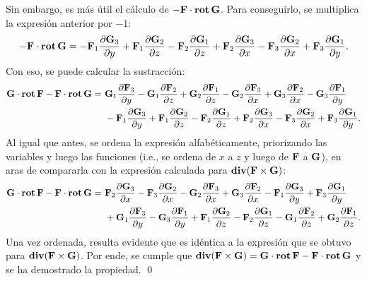 \documentclass{fmbvecto}
\begin{document}
\begin{problema}
\begin{equation*}
\end{equation*}
Sin embargo, es más útil el cálculo de \(- \bvec{F}\cdot \rot\bvec{G}\). Para conseguirlo, se multiplica la expresión anterior por \(-1\):
\begin{equation*}
    -\bvec{F}\cdot \rot\bvec{G} = - \bvec{F}_1 \frac{\partial \bvec{G}_3}{\partial y} + \bvec{F}_1\frac{\partial \bvec{G}_2}{\partial z} -\bvec{F}_2\frac{\partial \bvec{G}_1}{\partial z} + \bvec{F}_2\frac{\partial \bvec{G}_3}{\partial x} - \bvec{F}_3\frac{\partial \bvec{G}_2}{\partial x} + \bvec{F}_3\frac{\partial \bvec{G}_1}{\partial y}.
\end{equation*}
Con eso, se puede calcular la sustracción:
\begin{align*}
    \bvec{G}\cdot \rot\bvec{F} - \bvec{F}\cdot \rot \bvec{G} = \ & \bvec{G}_1 \frac{\partial \bvec{F}_3}{\partial y} - \bvec{G}_1\frac{\partial \bvec{F}_2}{\partial z} + \bvec{G}_2\frac{\partial \bvec{F}_1}{\partial z} - \bvec{G}_2\frac{\partial \bvec{F}_3}{\partial x} + \bvec{G}_3\frac{\partial \bvec{F}_2}{\partial x} - \bvec{G}_3\frac{\partial \bvec{F}_1}{\partial y} \\ &- \bvec{F}_1 \frac{\partial \bvec{G}_3}{\partial y} + \bvec{F}_1\frac{\partial \bvec{G}_2}{\partial z} -\bvec{F}_2\frac{\partial \bvec{G}_1}{\partial z} + \bvec{F}_2\frac{\partial \bvec{G}_3}{\partial x} - \bvec{F}_3\frac{\partial \bvec{G}_2}{\partial x} + \bvec{F}_3\frac{\partial \bvec{G}_1}{\partial y}.
\end{align*}
Al igual que antes, se ordena la expresión alfabéticamente, priorizando las variables y luego las funciones (i.e., se ordena de \(x\) a \(z\) y luego de \(\bvec{F}\) a \(\bvec{G}\)), en aras de compararla con la expresión calculada para \(\div (\bvec{F} \times \bvec{G})\):
\begin{align*}
    \bvec{G}\cdot \rot\bvec{F} - \bvec{F}\cdot \rot \bvec{G} = \ & \bvec{F}_2\frac{\partial  \bvec{G}_3}{\partial x} - \bvec{F}_3\frac{\partial \bvec{G}_2}{\partial x} - \bvec{G}_2\frac{\partial \bvec{F}_3 }{\partial x} + \bvec{G}_3\frac{\partial \bvec{F}_2}{\partial x} - \bvec{F}_1\frac{\partial \bvec{G}_3}{\partial y} + \bvec{F}_3\frac{\partial \bvec{G}_1}{\partial y} \\ & + \bvec{G}_1\frac{\partial \bvec{F}_3}{\partial y} - \bvec{G}_3\frac{\partial \bvec{F}_1}{\partial y} + \bvec{F}_1\frac{\partial \bvec{G}_2}{\partial z} - \bvec{F}_2\frac{\partial \bvec{G}_1}{\partial z} - \bvec{G}_1\frac{\partial \bvec{F}_2}{\partial z} + \bvec{G}_2 \frac{\partial \bvec{F}_1}{\partial z}   .
\end{align*}
Una vez ordenada, resulta evidente que es idéntica a la expresión que se obtuvo para \(\div (\bvec{F} \times \bvec{G})\). Por ende, se cumple que  \(\div (\bvec{F} \times \bvec{G}) = \bvec{G}\cdot \rot\bvec{F} - \bvec{F}\cdot \rot \bvec{G}\) y se ha demostrado la propiedad.
\qed
\end{problema}
\end{document}
